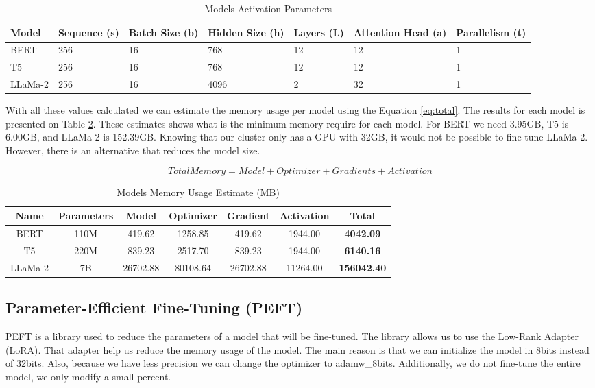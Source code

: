 \begin{table}[H]
	\centering
	\caption{Models Activation Parameters}
	\begin{tabular}{||p{1.75cm} | p{2cm} | p{1.75cm} | p{1.75cm} | p{1.5cm} | p{2cm} | p{2.75cm}||} 
		\hline
		\textbf{Model} & \textbf{Sequence (s)} & \textbf{Batch Size (b)} & \textbf{Hidden Size (h)} & \textbf{Layers (L)} & \textbf{Attention Head (a)} & \textbf{Parallelism (t)} \\ [1ex] 
		\hline
		BERT & 256 & 16 & 768 & 12 & 12 & 1 \\ [1ex]
		\hline
		T5 & 256 & 16 & 768 & 12 & 12 & 1  \\[1ex]
		\hline
		LLaMa-2 & 256 & 16 & 4096 & 2 & 32 & 1  \\[1ex]
		\hline
	\end{tabular}
	\label{table:ModelActivation}
\end{table}


With all these values calculated we can estimate the memory usage per model using the Equation \ref{eq:total}. The results for each model is presented on Table \ref{table:MemoryUsage}. These estimates shows what is the minimum memory require for each model. For BERT we need 3.95GB, T5 is 6.00GB, and LLaMa-2 is 152.39GB. Knowing that our cluster only has a GPU with 32GB, it would not be possible to fine-tune LLaMa-2. However, there is an alternative that reduces the model size. 
	
\[ Total Memory = Model + Optimizer + Gradients + Activation \label{eq:total} \tag{5} \] 

\begin{table}[H]
	\centering
	\caption{Models Memory Usage Estimate (MB)}
	\begin{tabular}{||c | c | c | c | c | c | c||} 
		\hline
		\textbf{Name} & \textbf{Parameters} & \textbf{Model} & \textbf{Optimizer} & \textbf{Gradient} & \textbf{Activation} & \textbf{Total} \\ [1ex] 
		\hline
		BERT & 110M & 419.62 & 1258.85 & 419.62 & 1944.00 & \textbf{4042.09} \\ [1ex]
		\hline
		T5 & 220M & 839.23 & 2517.70 & 839.23 & 1944.00 & \textbf{6140.16}  \\[1ex]
		\hline
		LLaMa-2 & 7B & 26702.88 & 80108.64 & 26702.88 & 11264.00 & \textbf{156042.40}  \\[1ex]
		\hline
	\end{tabular}
	\label{table:MemoryUsage}
\end{table}

\subsection{Parameter-Efficient Fine-Tuning (PEFT)}
PEFT is a library used to reduce the parameters of a model that will be fine-tuned. The library allows us to use the Low-Rank Adapter (LoRA). That adapter
help us reduce the memory usage of the model. The main reason is that we can initialize the model in 8bits instead of 32bits. Also, because we have less precision
we can change the optimizer to adamw\_8bits. Additionally, we do not fine-tune the entire model, we only modify a small percent. 

